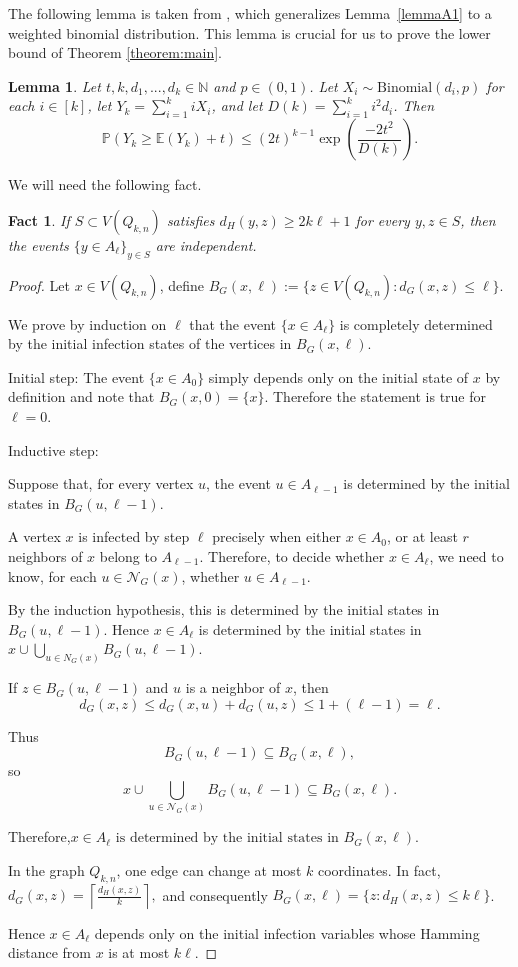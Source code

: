 \documentclass[reqno,11pt]{amsart}
\newtheorem{lemma}[theorem]{Lemma}
\newtheorem{fact}[theorem]{Fact}
\renewcommand{\le}{\leqslant}
\renewcommand{\leq}{\leqslant}
\renewcommand{\geq}{\geqslant}
\begin{document}
 The following lemma is taken from \cite{balogh_bollobas_morris_2009}, which generalizes Lemma~\ref{lemmaA1} to a weighted binomial distribution. This lemma is crucial for us to prove the lower bound of Theorem \ref{theorem:main}.
\begin{lemma} \label{lemmaA8}
Let $t,k,d_1,...,d_k \in \mathbb{N}$ and $p \in (0,1)$. Let $X_i \sim \text{Binomial}(d_i,p)$ for each $i \in [k]$, let $Y_k=\sum_{i=1}^kiX_i$, and let $D(k)=\sum_{i=1}^ki^2d_i$. Then 
$$\mathbb{P}(Y_k \geq \mathbb{E}(Y_k)+t) \leq (2t)^{k-1}\exp\left(\frac{-2t^2}{D(k)} \right).$$
\end{lemma}
We will need the following fact.
\begin{fact} \label{fact3}
    If $S \subset V(Q_{k,n})$ satisfies $d_H(y,z) \geq 2k\ell+1$ for every $y,z \in S$, then the events $\{y \in A_{\ell}\}_{y \in S}$ are independent.
\end{fact}
\begin{proof}
Let $x \in V(Q_{k,n})$, define $B_G(x,\ell):=\{z\in V(Q_{k,n}): d_G(x,z)\le \ell\}.$

We prove by induction on $\ell$ that the event $\{x\in A_\ell\}$ is completely determined by the initial infection states of the vertices in $B_G(x,\ell)$.

Initial step:
The event $\{x\in A_0\}$ simply depends only on the initial state of $x$ by definition and note that $B_G(x,0)=\{x\}$. Therefore the statement is true for $\ell=0$.


Inductive step:

Suppose that, for every vertex $u$, the event ${u\in A_{\ell-1}}$ is determined by the initial states in $B_G(u,\ell-1)$.

A vertex $x$ is infected by step $\ell$ precisely when either $x\in A_0$,
or at least $r$ neighbors of $x$ belong to $A_{\ell-1}$. Therefore, to decide whether $x\in A_\ell$, we need to know, for each $u\in \mathcal{N}_G(x)$, whether $u\in A_{\ell-1}$.


By the induction hypothesis, this is determined by the initial states in $B_G(u,\ell-1)$. Hence $x\in A_\ell$ is determined by the initial states in ${x}\cup\bigcup_{u\in N_G(x)}B_G(u,\ell-1)$.


If $z\in B_G(u,\ell-1)$ and $u$ is a neighbor of $x$, then 
$$d_G(x,z)
\le d_G(x,u)+d_G(u,z)
\le 1+(\ell-1)
=\ell.$$


Thus
$$
B_G(u,\ell-1)\subseteq B_G(x,\ell),$$
so
$$
x\cup\bigcup_{u\in \mathcal{N}_G(x)}B_G(u,\ell-1)
\subseteq B_G(x,\ell).
$$

Therefore,$ {x\in A_\ell}\text{ is determined by the initial states in }B_G(x,\ell)$.


In the graph $Q_{k,n}$, one edge can change at most $k$ coordinates. In fact, $ d_G(x,z)=\left\lceil
\frac{d_H(x,z)}{k}
\right\rceil, $ and consequently $B_G(x,\ell)=\{z: d_H(x,z)\le k\ell\}$.


Hence ${x\in A_\ell}$ depends only on the initial infection variables whose Hamming distance from $x$ is at most $k\ell$.   
\end{proof}
\end{document}
